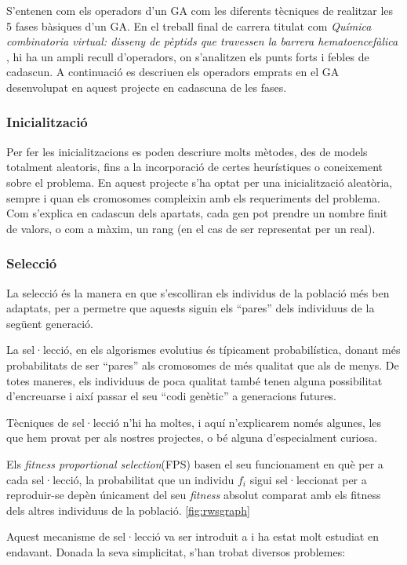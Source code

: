 S'entenen com els operadors d'un GA com les diferents tècniques de realitzar les
5 fases bàsiques d'un GA. En el treball final de carrera titulat com
\emph{Química combinatoria virtual: disseny de pèptids que travessen la barrera
hematoencefàlica} \cite{B01},  hi ha un ampli recull d'operadors, on s'analitzen
els punts forts i febles de cadascun.  A continuació es descriuen els operadors
emprats en el GA desenvolupat en aquest projecte en cadascuna de les fases.

\subsubsection{Inicialització} 

Per fer les inicialitzacions es poden descriure molts mètodes, des de models
totalment aleatoris, fins a la incorporació de certes heurístiques o coneixement
sobre el problema. En aquest projecte s'ha optat per una inicialització
aleatòria, sempre i quan els cromosomes compleixin amb els requeriments del
problema.  Com s'explica en cadascun dels apartats, cada gen pot prendre un
nombre finit de valors, o com a màxim, un rang (en el cas de ser representat per
un real).

\subsubsection{Selecció}
La selecció és la manera en que s'escolliran els individus de la població més
ben adaptats, per a permetre que aquests siguin els ``pares'' dels individuus de
la següent generació.

La sel·lecció, en els algorismes evolutius és típicament probabilística, donant
més probabilitats de ser ``pares'' als cromosomes de més qualitat que als de
menys.  De totes maneres, els individuus de poca qualitat també tenen alguna
possibilitat d'encreuarse i així passar el seu ``codi genètic'' a generacions
futures.

Tècniques de sel·lecció n'hi ha moltes, i aquí n'explicarem només algunes, les
que hem provat per als nostres projectes, o bé alguna d'especialment curiosa.

Els \emph{fitness proportional selection}(FPS) basen el seu funcionament en què
per a cada sel·lecció, la probabilitat que un individu $f_i$ sigui sel·leccionat
per a reproduir-se depèn únicament del seu \emph{fitness} absolut comparat amb
els fitness dels altres individuus de la població. \ref{fig:rwsgraph} 

Aquest mecanisme de sel·lecció va ser introduit a \cite{H75} i ha estat molt
estudiat en endavant.  Donada la seva simplicitat, s'han trobat diversos
problemes:

